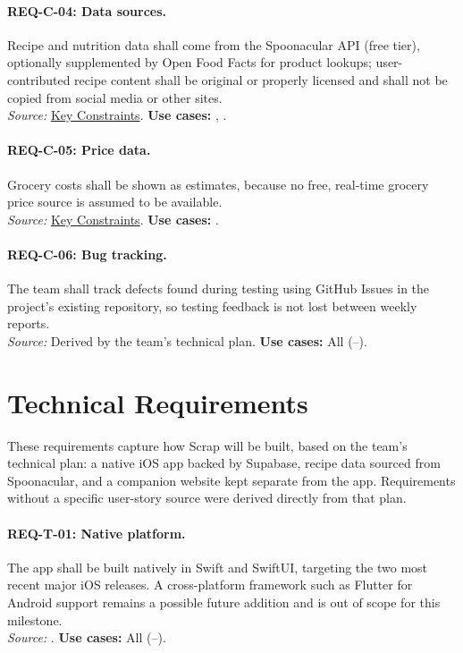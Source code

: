 \paragraph{REQ-C-04: Data sources.}
 Recipe and nutrition data shall come from the Spoonacular API (free tier), optionally supplemented by Open Food Facts for product lookups; user-contributed recipe content shall be original or properly licensed and shall not be copied from social media or other sites.\\
\textit{Source:} \hyperref[Chapter:KeyConstraints]{Key Constraints}. \textbf{Use cases:} , .

\paragraph{REQ-C-05: Price data.}
 Grocery costs shall be shown as estimates, because no free, real-time grocery price source is assumed to be available.\\
\textit{Source:} \hyperref[Chapter:KeyConstraints]{Key Constraints}. \textbf{Use cases:} .

\paragraph{REQ-C-06: Bug tracking.}
 The team shall track defects found during testing using GitHub Issues in the project's existing repository, so testing feedback is not lost between weekly reports.\\
\textit{Source:} Derived by the team's technical plan. \textbf{Use cases:} All (--).

\section{Technical Requirements}

\noindent These requirements capture how Scrap will be built, based on the team's technical plan: a native iOS app backed by Supabase, recipe data sourced from Spoonacular, and a companion website kept separate from the app. Requirements without a specific user-story source were derived directly from that plan.

\paragraph{REQ-T-01: Native platform.}
 The app shall be built natively in Swift and SwiftUI, targeting the two most recent major iOS releases. A cross-platform framework such as Flutter for Android support remains a possible future addition and is out of scope for this milestone.\\
\textit{Source:} . \textbf{Use cases:} All (--).

